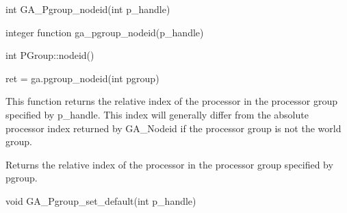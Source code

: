 \documentclass[12pt]{article}
\begin{document}


\begin{capi}
\begin{ccode}
int GA_Pgroup_nodeid(int p_handle)
\end{ccode}
\begin{funcargs}
\end{funcargs}
\end{capi}

\begin{fapi}
\begin{fcode}
integer function ga_pgroup_nodeid(p_handle)
\end{fcode}
\begin{funcargs}
\end{funcargs}
\end{fapi}

\begin{cxxapi}
\begin{cxxcode}
int PGroup::nodeid()
\end{cxxcode}
\end{cxxapi}

\begin{pyapi}
\begin{pycode}
ret = ga.pgroup_nodeid(int pgroup)
\end{pycode}
\begin{funcargs}
\end{funcargs}
\end{pyapi}

\local

\begin{desc}
This function returns the relative index of the processor in the processor
group specified by p_handle. This index will generally differ from the absolute
processor index returned by GA_Nodeid if the processor group is not the world
group.

Returns the relative index of the processor in the processor group
specified by pgroup.
\end{desc}



\begin{capi}
\begin{ccode}
void GA_Pgroup_set_default(int p_handle)
\end{ccode}
\begin{funcargs}
\end{funcargs}
\end{capi}
\end{document}
